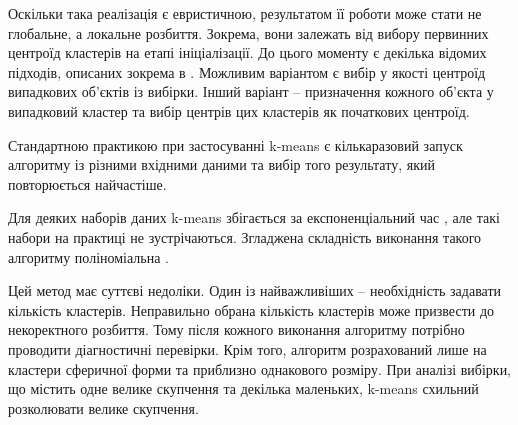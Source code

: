         Оскільки така реалізація є евристичною, результатом її роботи може стати не глобальне, а локальне розбиття. Зокрема, вони залежать від вибору первинних центроїд кластерів на етапі ініціалізації. До цього моменту є декілька відомих підходів, описаних зокрема в \cite{HamerlyKMeansOptimization}. Можливим варіантом є вибір у якості центроїд випадкових об'єктів із вибірки. Інший варіант -- призначення кожного об'єкта у випадковий кластер та вибір центрів цих кластерів як початкових центроїд.
        
        Стандартною практикою при застосуванні k-means є кількаразовий запуск алгоритму із різними вхідними даними та вибір того результату, який повторюється найчастіше.
        
        Для деяких наборів даних k-means збігається за експоненціальний час \cite{KMeansWorstCaseComplexity}, але такі набори на практиці не зустрічаються. Згладжена складність виконання такого алгоритму поліноміальна \cite{KMeansSmoothedComplexity}.
        
        Цей метод має суттєві недоліки. Один із найважливіших -- необхідність задавати кількість кластерів. Неправильно обрана кількість кластерів може призвести до некоректного розбиття. Тому після кожного виконання алгоритму потрібно проводити діагностичні перевірки. Крім того, алгоритм розрахований лише на кластери сферичної форми та приблизно однакового розміру. При аналізі вибірки, що містить одне велике скупчення та декілька маленьких, k-means схильний розколювати велике скупчення.
